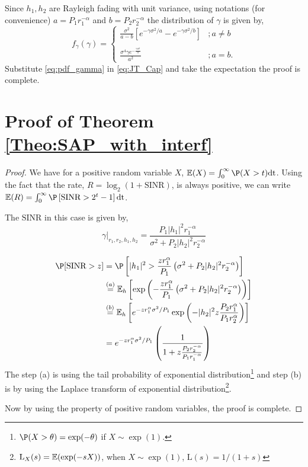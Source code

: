 Since $h_1, h_2$  are Rayleigh fading with unit variance, using notations (for convenience) $a=P_1 r_1^{-\alpha}$ and $b=P_2 r_2^{-\alpha}$ the distribution of $\gamma$ is given by,
\begin{equation}
f_\gamma(\gamma)  = \begin{cases}
\displaystyle\frac{\sigma^2}{a - b}\left[e^{-\gamma\sigma^2/ a}- e^{-\gamma\sigma^2 / b}\right] &; a\neq b\\\\
\displaystyle\frac{\sigma ^4 \gamma   e^{-\frac{\gamma  \sigma ^2 }{a}}}{a^2} &; a= b.
\end{cases}
\label{eq:pdf_gamma}
\end{equation}
Substitute \eqref{eq:pdf_gamma} in \eqref{eq:JT_Cap} and take the expectation the proof is complete.




\section{Proof of Theorem \ref{Theo:SAP_with_interf} }\label{App:theo_SAP}
\begin{proof}
	We have for a positive random variable $X$, $\E(X)=\int_{0}^{\infty}\P(X>t)\text{dt}$. Using the fact that the rate, $R=\log_2(1+\text{SINR})$, is always positive, we can write $\E(R)=\int_{0}^{\infty}\P\left[\text{SINR}>2^t-1\right] \text{dt}$.
	
	The $\text{SINR}$ in this case is given by,
	\[
	\gamma|_{r_1,r_2,h_1,h_2}=\frac{P_1|h_1|^2r_1^{-\alpha}}{\sigma^2+P_2|h_2|^2r_2^{-\alpha}}
	\]
	
	\begin{align}\label{eqn:deri_jt_inter}
	\P[\text{SINR}>z]&=\P\left[|h_1|^2>\frac{zr_1^{\alpha}}{P_1}\left(\sigma^2+P_2|h_2|^2r_2^{-\alpha}\right)\right]\nonumber\\
	&\stackrel{(a)}{=}\E_{h}\left[\exp\left(-\frac{zr_1^{\alpha}}{P_1}\left(\sigma^2+P_2|h_2|^2r_2^{-\alpha}\right)\right)\right]\nonumber\\
	&\stackrel{(b)}{=}\E_{h}\left[e^{-zr_1^{\alpha}\sigma^2/P_1}\exp\left(-|h_2|^2z\frac{P_2r_1^{\alpha}}{P_1 r_2^{\alpha}}\right)\right]\nonumber\\
	&=e^{-zr_1^{\alpha}\sigma^2/P_1}\left(\frac{1}{1+z\frac{P_2r_2^{-\alpha}}{P_1 r_1^{-\alpha}}}\right)
	\end{align}
	The step (a) is using the tail probability of exponential distribution\footnote{$\P(X>\theta)=\exp(-\theta)$ if $X\sim \exp(1).$} and step (b) is by using the Laplace transform of exponential distribution\footnote{$\text{L}_X(s)=\operatorname{\mathbb{E}}(\exp(-sX))$, when $X\sim\exp(1)$, $\text{L}(s)=1/(1+s)$}. 
	
	Now by using the property of positive random variables, the proof is complete.
	
	
	
\end{proof}

